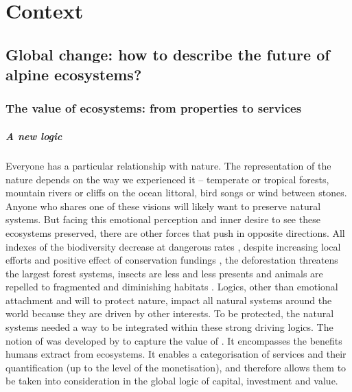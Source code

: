 

\chapter{Context}

\section{Global change: how to describe the future of alpine ecosystems?}

\subsection{The value of ecosystems: from properties to services}

\paragraph{A new logic}
Everyone has a particular relationship with nature. The representation of the nature depends on the way we experienced it -- temperate or tropical forests, mountain rivers or cliffs on the ocean littoral, bird songs or wind between stones. Anyone who shares one of these visions will likely want to preserve natural systems. But facing this emotional perception and inner desire to see these ecosystems preserved, there are other forces that push in opposite directions. All indexes of the biodiversity decrease at dangerous rates \parencite{butchart_global_2010}, despite increasing local efforts and positive effect of conservation fundings \parencite{waldron_reductions_2017}, the deforestation threatens the largest forest systems, insects are less and less presents \parencite{hallmann_more_2017} and animals are repelled to fragmented and diminishing habitats \parencite{tucker_moving_2018}. Logics, other than emotional attachment and will to protect nature, impact all natural systems around the world because they are driven by other interests. To be protected, the natural systems needed a way to be integrated within these strong driving logics. The notion of  was developed by \citet{costanza_value_1997} to capture the value of . It encompasses the benefits humans extract from ecosystems. It enables a categorisation of services and their quantification (up to the level of the monetisation), and therefore allows them to be taken into consideration in the global logic of capital, investment and value.


